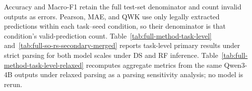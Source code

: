 Accuracy and Macro-F1 retain the full test-set denominator and count invalid
outputs as errors. Pearson, MAE, and QWK use only legally extracted predictions
within each task--seed condition, so their denominator is that condition's
valid-prediction count. Table~\ref{tab:full-method-task-level} and~\ref{tab:full-so-rs-secondary-merged}
reports task-level primary results under strict parsing for both model scales under
DS and RF inference. Table~\ref{tab:full-method-task-level-relaxed} recomputes aggregate
metrics from the same Qwen3-4B outputs under relaxed parsing as a parsing
sensitivity analysis; no model is rerun.